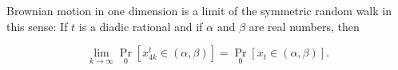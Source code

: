 Brownian motion in one dimension is a limit of the symmetric random walk in this sense: If $t$ is a diadic rational and if $\alpha$ and $\beta$ are real numbers, then

$$\lim_{k \to \infty} \Pr_0[x_{4k}^t \in (\alpha, \beta)] = \Pr_0[x_t \in (\alpha, \beta)].$$
